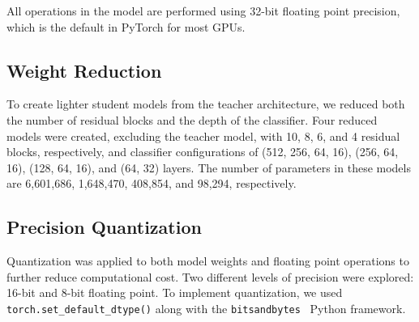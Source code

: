 All operations in the model are performed using 32-bit floating point precision,
which is the default in PyTorch \cite{paszke2019pytorch}
for most GPUs.

\subsection{Weight Reduction}
\label{sec:method:weight_reduction}

To create lighter student models from the teacher architecture,
we reduced both the number of residual blocks and the depth of the classifier.
Four reduced models were created, excluding the teacher model,
with 10, 8, 6, and 4 residual blocks, respectively,
and classifier configurations of (512, 256, 64, 16), (256, 64, 16), (128, 64, 16), and (64, 32) layers.
The number of parameters in these models are 6,601,686, 1,648,470, 408,854, and 98,294, respectively.

\subsection{Precision Quantization}
\label{sec:method:precision_quantization}

Quantization was applied to both model weights and floating point operations
to further reduce computational cost.
Two different levels of precision were explored: 16-bit and 8-bit floating point.
To implement quantization,
we used \texttt{torch.set\_default\_dtype()} along with the \texttt{bitsandbytes}~\cite{bitsandbytes} Python framework.
